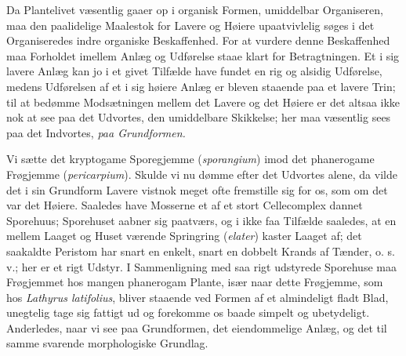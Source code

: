 \documentclass[12pt,a4paper]{book}
\begin{document}
Da Plantelivet væsentlig gaaer op i organisk Formen, umiddelbar
Organiseren, maa den paalidelige Maalestok for Lavere og Høiere
upaatvivlelig søges i det Organiseredes indre organiske Beskaffenhed.
For at vurdere denne Beskaffenhed maa Forholdet imellem Anlæg og
Udførelse staae klart for Betragtningen. Et i sig lavere Anlæg kan jo i
et givet Tilfælde have fundet en rig og alsidig Udførelse, medens
Udførelsen af et i sig høiere Anlæg er bleven staaende paa et lavere
Trin; til at bedømme Modsætningen mellem det Lavere og det Høiere er det
altsaa ikke nok at see paa det Udvortes, den umiddelbare Skikkelse; her
maa væsentlig sees paa det Indvortes, \emph{paa Grundformen.}

Vi sætte det kryptogame Sporegjemme (\textit{sporangium}) imod det
phanerogame Frøgjemme (\textit{pericarpium}). Skulde
\setcounter{footnote}{0}
vi nu dømme efter det Udvortes alene, da vilde det i sin Grundform
Lavere vistnok meget ofte fremstille sig for os, som om det var det
Høiere. Saaledes have Mosserne et af et stort Cellecomplex dannet
Sporehuus; Sporehuset aabner sig paatværs, og i ikke faa Tilfælde
saaledes, at en mellem Laaget og Huset værende Springring
(\textit{elater}) kaster Laaget af; det saakaldte Peristom har snart en
enkelt, snart en dobbelt Krands af Tænder, o. s. v.; her er et rigt
Udstyr. I Sammenligning med saa rigt udstyrede Sporehuse maa Frøgjemmet
hos mangen phanerogam Plante, især naar dette Frøgjemme, som hos
\textit{Lathyrus latifolius}, bliver staaende ved Formen af et
almindeligt fladt Blad, unegtelig tage sig fattigt ud og forekomme os
baade simpelt og ubetydeligt. Anderledes, naar vi see paa Grundformen,
det eiendommelige Anlæg, og det til samme svarende morphologiske
Grundlag.
\end{document}
